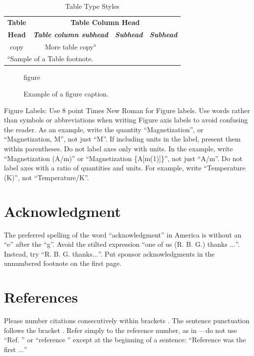 \documentclass[conference]{IEEEtran}
\begin{document}
\begin{table}[htbp]
\caption{Table Type Styles}
\begin{center}
\begin{tabular}{|c|c|c|c|}
\hline
\textbf{Table}&\multicolumn{3}{|c|}{\textbf{Table Column Head}} \\
\cline{2-4} 
\textbf{Head} & \textbf{\textit{Table column subhead}}& \textbf{\textit{Subhead}}& \textbf{\textit{Subhead}} \\
\hline
copy& More table copy$^{\mathrm{a}}$& &  \\
\hline
\multicolumn{4}{l}{$^{\mathrm{a}}$Sample of a Table footnote.}
\end{tabular}
\label{tab1}
\end{center}
\end{table}

\begin{figure}[htbp]
\centerline{figure}
\caption{Example of a figure caption.}
\label{fig}
\end{figure}

Figure Labels: Use 8 point Times New Roman for Figure labels. Use words 
rather than symbols or abbreviations when writing Figure axis labels to 
avoid confusing the reader. As an example, write the quantity 
``Magnetization'', or ``Magnetization, M'', not just ``M''. If including 
units in the label, present them within parentheses. Do not label axes only 
with units. In the example, write ``Magnetization (A/m)'' or ``Magnetization 
\{A[m(1)]\}'', not just ``A/m''. Do not label axes with a ratio of 
quantities and units. For example, write ``Temperature (K)'', not 
``Temperature/K''.

\section*{Acknowledgment}

The preferred spelling of the word ``acknowledgment'' in America is without 
an ``e'' after the ``g''. Avoid the stilted expression ``one of us (R. B. 
G.) thanks $\ldots$''. Instead, try ``R. B. G. thanks$\ldots$''. Put sponsor 
acknowledgments in the unnumbered footnote on the first page.

\section*{References}

Please number citations consecutively within brackets \cite{b1}. The 
sentence punctuation follows the bracket \cite{b2}. Refer simply to the reference 
number, as in \cite{b3}---do not use ``Ref. \cite{b3}'' or ``reference \cite{b3}'' except at 
the beginning of a sentence: ``Reference \cite{b3} was the first $\ldots$''
\end{document}
